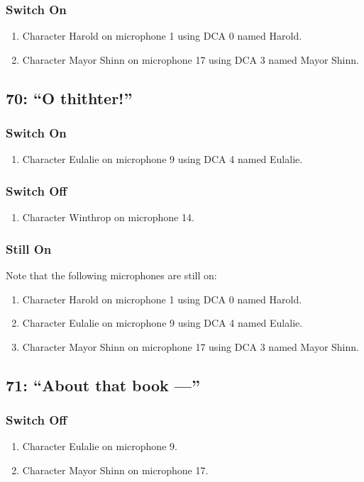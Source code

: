 \subsubsection* {Switch On}
\begin{enumerate}
\item Character Harold on microphone 1 using DCA 0 named Harold.
\item Character Mayor Shinn on microphone 17 using DCA 3 named Mayor Shinn.
\end{enumerate}
\subsection* {70: ``O thithter!''}
\subsubsection* {Switch On}
\begin{enumerate}
\item Character Eulalie on microphone 9 using DCA 4 named Eulalie.
\end{enumerate}
\subsubsection* {Switch Off}
\begin{enumerate}
\item Character Winthrop on microphone 14.
\end{enumerate}
\subsubsection* {Still On}
Note that the following microphones are still on:
\begin{enumerate}
\item Character Harold on microphone 1 using DCA 0 named Harold.
\item Character Eulalie on microphone 9 using DCA 4 named Eulalie.
\item Character Mayor Shinn on microphone 17 using DCA 3 named Mayor Shinn.
\end{enumerate}
\subsection* {71: ``About that book ---''}
\subsubsection* {Switch Off}
\begin{enumerate}
\item Character Eulalie on microphone 9.
\item Character Mayor Shinn on microphone 17.
\end{enumerate}
